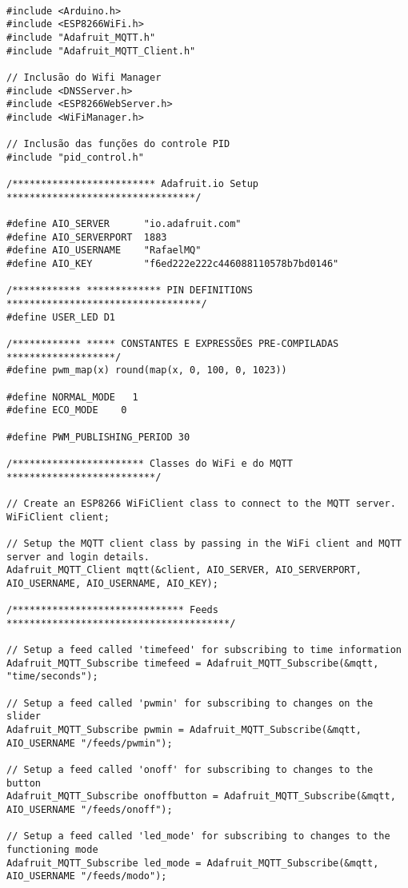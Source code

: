 \begin{lstlisting}

#include <Arduino.h>
#include <ESP8266WiFi.h>
#include "Adafruit_MQTT.h"
#include "Adafruit_MQTT_Client.h"

// Inclusão do Wifi Manager
#include <DNSServer.h>
#include <ESP8266WebServer.h>
#include <WiFiManager.h>

// Inclusão das funções do controle PID
#include "pid_control.h"

/************************* Adafruit.io Setup *********************************/

#define AIO_SERVER      "io.adafruit.com"
#define AIO_SERVERPORT  1883
#define AIO_USERNAME    "RafaelMQ"
#define AIO_KEY         "f6ed222e222c446088110578b7bd0146"

/************ ************* PIN DEFINITIONS **********************************/
#define USER_LED D1

/************ ***** CONSTANTES E EXPRESSÕES PRE-COMPILADAS *******************/
#define pwm_map(x) round(map(x, 0, 100, 0, 1023))

#define NORMAL_MODE   1
#define ECO_MODE    0

#define PWM_PUBLISHING_PERIOD 30

/*********************** Classes do WiFi e do MQTT **************************/

// Create an ESP8266 WiFiClient class to connect to the MQTT server.
WiFiClient client;

// Setup the MQTT client class by passing in the WiFi client and MQTT server and login details.
Adafruit_MQTT_Client mqtt(&client, AIO_SERVER, AIO_SERVERPORT, AIO_USERNAME, AIO_USERNAME, AIO_KEY);

/****************************** Feeds ***************************************/

// Setup a feed called 'timefeed' for subscribing to time information
Adafruit_MQTT_Subscribe timefeed = Adafruit_MQTT_Subscribe(&mqtt, "time/seconds");

// Setup a feed called 'pwmin' for subscribing to changes on the slider
Adafruit_MQTT_Subscribe pwmin = Adafruit_MQTT_Subscribe(&mqtt, AIO_USERNAME "/feeds/pwmin");

// Setup a feed called 'onoff' for subscribing to changes to the button
Adafruit_MQTT_Subscribe onoffbutton = Adafruit_MQTT_Subscribe(&mqtt, AIO_USERNAME "/feeds/onoff");

// Setup a feed called 'led_mode' for subscribing to changes to the functioning mode
Adafruit_MQTT_Subscribe led_mode = Adafruit_MQTT_Subscribe(&mqtt, AIO_USERNAME "/feeds/modo");


\end{lstlisting}
